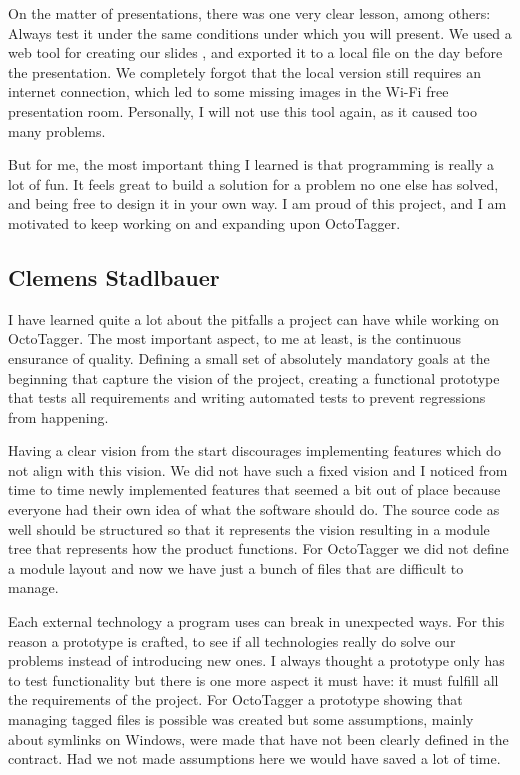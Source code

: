 On the matter of presentations, there was one very clear lesson, among others:
Always test it under the same conditions under which you will present. We used a
web tool for creating our slides \cite{slides}, and exported it to
a local file on the day before the presentation. We completely forgot that
the local version still requires an internet connection, which led to some
missing images in the Wi-Fi free presentation room. Personally, I will not use
this tool again, as it caused too many problems.

But for me, the most important thing I learned is that programming is really a
lot of fun. It feels great to build a solution for a problem no one else has
solved, and being free to design it in your own way. I am proud of this project,
and I am motivated to keep working on and expanding upon OctoTagger.

\subsection{Clemens Stadlbauer}

I have learned quite a lot about the pitfalls a project can have while working
on OctoTagger. The most important aspect, to me at least, is the continuous
ensurance of quality. Defining a small set of absolutely mandatory goals at the
beginning that capture the vision of the project, creating a functional
prototype that tests all requirements and writing automated tests to prevent
regressions from happening.

Having a clear vision from the start discourages implementing features which do
not align with this vision. We did not have such a fixed vision and I noticed
from time to time newly implemented features that seemed a bit out of place
because everyone had their own idea of what the software should do. The source
code as well should be structured so that it represents the vision resulting
in a module tree that represents how the product functions. For OctoTagger we
did not define a module layout and now we have just a bunch of files that are
difficult to manage.

Each external technology a program uses can break in unexpected ways. For this
reason a prototype is crafted, to see if all technologies really do solve our
problems instead of introducing new ones. I always thought a prototype only has
to test functionality but there is one more aspect it must have: it must fulfill
all the requirements of the project. For OctoTagger a prototype showing that
managing tagged files is possible was created but some assumptions, mainly about
symlinks on Windows, were made that have not been clearly defined in the
contract. Had we not made assumptions here we would have saved a lot of time.

